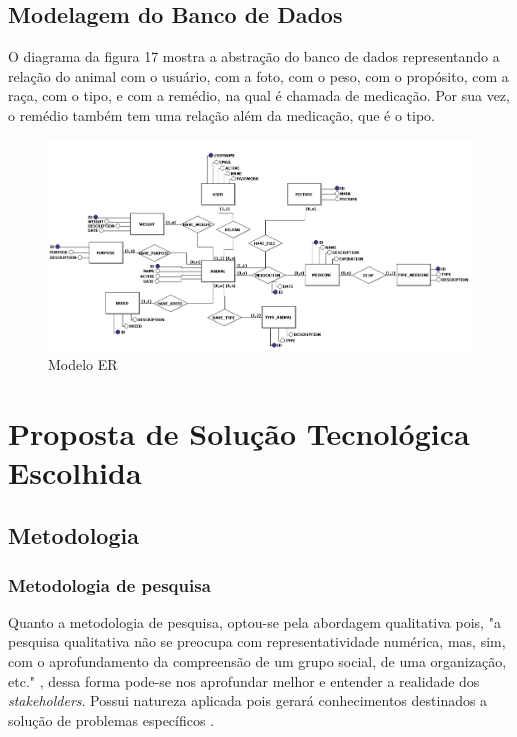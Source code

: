 \documentclass[12pt]{article}
\begin{document}
\newpage

\subsection{Modelagem do Banco de Dados}

O diagrama da figura 17 mostra a abstração do banco de dados representando a relação do animal com o usuário, com a foto, com o peso, com o propósito, com a raça, com o tipo, e com a remédio, na qual é chamada de medicação. Por sua vez, o remédio também tem uma relação além da medicação, que é o tipo.  

\begin{figure}[!h]
	\begin{center}
		\caption{Modelo ER}
		\includegraphics[width=6in]{img/erdoboi.jpeg}


	\end{center}
\end{figure}

\newpage

\section{Proposta de Solução Tecnológica Escolhida}

\subsection{Metodologia}

\subsubsection{Metodologia de pesquisa}

Quanto a metodologia de pesquisa, optou-se pela abordagem qualitativa pois, "a pesquisa qualitativa não se preocupa com representatividade numérica, mas, sim, com o aprofundamento da compreensão de um grupo social, de uma organização, etc." \cite{ufrgs09}, dessa forma pode-se nos aprofundar melhor e entender a realidade dos \emph{stakeholders}. Possui natureza aplicada pois gerará conhecimentos destinados a solução de problemas específicos \cite{ufrgs09} .
\end{document}
